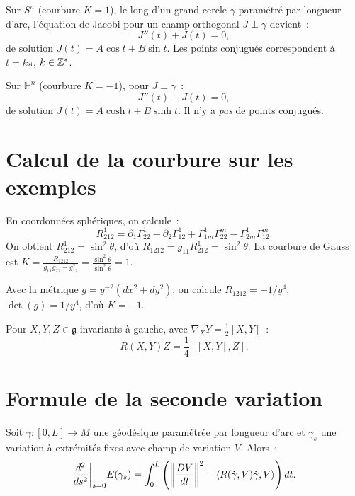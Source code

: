 \begin{exemple}
Sur $S^n$ (courbure $K = 1$), le long d'un grand cercle $\gamma$ param\'etr\'e par
longueur d'arc, l'\'equation de Jacobi pour un champ orthogonal $J \perp \dot\gamma$
devient~:
\[
    J''(t) + J(t) = 0,
\]
de solution $J(t) = A\cos t + B\sin t$. Les points conjugu\'es correspondent
\`a $t = k\pi$, $k \in \mathbb{Z}^*$.
\end{exemple}

\begin{exemple}
Sur $\mathbb{H}^n$ (courbure $K = -1$), pour $J \perp \dot\gamma$~:
\[
    J''(t) - J(t) = 0,
\]
de solution $J(t) = A\cosh t + B\sinh t$. Il n'y a \emph{pas} de points conjugu\'es.
\end{exemple}

\section{Calcul de la courbure sur les exemples}

\begin{exemple}[Courbure de $S^2$]
En coordonn\'ees sph\'eriques, on calcule~:
\[
    R^1_{212} = \partial_1\Gamma^1_{22} - \partial_2\Gamma^1_{12}
    + \Gamma^1_{1m}\Gamma^m_{22} - \Gamma^1_{2m}\Gamma^m_{12}.
\]
On obtient $R^1_{212} = \sin^2\!\theta$, d'o\`u
$R_{1212} = g_{11} R^1_{212} = \sin^2\!\theta$. La courbure de Gauss est
$K = \frac{R_{1212}}{g_{11}g_{22} - g_{12}^2} = \frac{\sin^2\theta}{\sin^2\theta} = 1$.
\end{exemple}

\begin{exemple}
Avec la m\'etrique $g = y^{-2}(dx^2 + dy^2)$, on calcule $R_{1212} = -1/y^4$,
$\det(g) = 1/y^4$, d'o\`u $K = -1$.
\end{exemple}

\begin{exemple}
Pour $X, Y, Z \in \mathfrak{g}$ invariants \`a gauche, avec $\nabla_X Y = \frac{1}{2}[X,Y]$~:
\[
    R(X,Y)Z = \frac{1}{4}[[X,Y],Z].
\]
\end{exemple}

\section{Formule de la seconde variation}

\begin{theoreme}
Soit $\gamma : [0, L] \to M$ une g\'eod\'esique param\'etr\'ee par longueur d'arc et
$\gamma_s$ une variation \`a extr\'emit\'es fixes avec champ de variation $V$.
Alors~:
\[
    \frac{d^2}{ds^2}\bigg|_{s=0} E(\gamma_s) = \int_0^L \left(
    \left\| \frac{DV}{dt} \right\|^2 - \langle R(\dot\gamma, V)\dot\gamma, V \rangle\right) dt.
\]
\end{theoreme}

